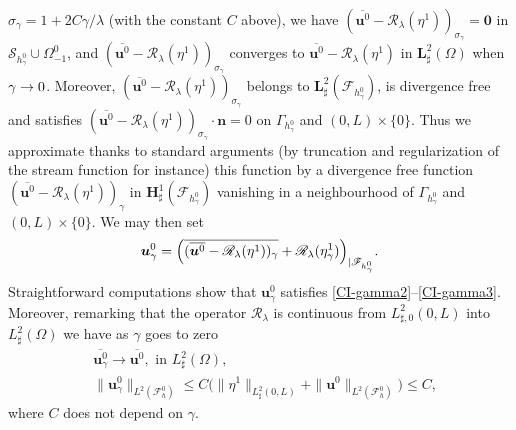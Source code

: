 \documentclass[JEP,XML,SOM,Unicode,NoFloatCountersInSection]{cedram}
\let\mathcal\mathscr
\theoremstyle{remark}
\theoremstyle{definition}
\newcommand{\ug}{\boldsymbol{u}}
\newcommand{\BS}[1]{\boldsymbol{#1}}
\let\CM\Omega
\begin{document}
$\sigma_{\gamma}\!=\!1+ 2C\gamma/\lambda$ (with the constant $C$ above), we have \hbox{$(\overline{\ug^{0}}\!-\!\mathcal{R}_\lambda(\eta^1))_{\sigma_\gamma}\!=\BS{0}$} in $\mathcal{S}_{h_\gamma^0}\cup \Omega_{-1}^0$, and $(\overline{\ug^{0}}-\mathcal{R}_\lambda(\eta^1))_{\sigma_\gamma}$ converges to $\overline{\ug^{0}}-\mathcal{R}_\lambda(\eta^1)$ in $\BS{L}_\sharp^2(\CM)$ when $\gamma \to\nobreak 0$. Moreover, $(\overline{\ug^{0}}-\mathcal{R}_\lambda(\eta^1))_{\sigma_\gamma}$ belongs to $\BS{L}^2_{\sharp}(\mathcal{F}_{h_\gamma^0})$, is divergence free and satisfies $(\overline{\ug^{0}}-\mathcal{R}_\lambda(\eta^1))_{\sigma_\gamma}\cdot\BS{n} =0$ on $\Gamma_{h^0_\gamma}$ and $(0, L)\times\{0\}$. Thus we approximate thanks to standard arguments (by truncation and regularization of the stream function for instance) this function by a divergence free function $(\overline{\ug^{0}}-\mathcal{R}_\lambda(\eta^1))_{\gamma}$ in $\BS{H}^1_{\sharp}(\mathcal{F}_{h_\gamma^0})$ vanishing in a neighbourhood of $\Gamma_{h^0_\gamma}$ and $(0, L)\times\{0\}$. We may then set
\[
\ug_{\gamma}^0 = \Bigl( \overline{(\overline{\ug^{0}}-\mathcal{R}_\lambda(\eta^1))_{\gamma} }+\mathcal{R}_\lambda(\eta_\gamma^1)\Bigr)_{|{\mathcal{F}_{h_\gamma^0}}}.
\]
Straightforward computations show that $\ug_{\gamma}^0$ satisfies \eqref{CI-gamma2}--\eqref{CI-gamma3}. Moreover,
remarking that the operator $\mathcal R_{\lambda}$ is continuous from $L^2_{\sharp,0}(0,L)$ into $L_\sharp^2(\Omega)$ we have as $\gamma$ goes to zero
\begin{align*}
& \overline{\ug^0_\gamma}\to \overline{\ug^0}, \text{ in }L^2_\sharp(\Omega),\\
& \| \ug^0_\gamma \|_{{L}^2(\mathcal F^0_{h})}\leq C\bigl( \|\eta^1\|_{L^2_\sharp(0, L)} + \|\ug^0\|_{L^2(\mathcal F_h^0)} \bigr)\leq C,
\end{align*}
where $C$ does not depend on $\gamma$.
\end{document}

